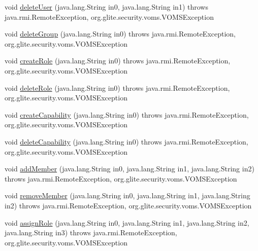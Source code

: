 \begin{DoxyCompactItemize}
\item 
void \hyperlink{classorg_1_1glite_1_1security_1_1voms_1_1service_1_1admin_1_1VOMSAdminSoapBindingStub_ad0af3872260de83449b50dcd1b0f8b10}{deleteUser} (java.lang.String in0, java.lang.String in1)  throws java.rmi.RemoteException, org.glite.security.voms.VOMSException 
\item 
void \hyperlink{classorg_1_1glite_1_1security_1_1voms_1_1service_1_1admin_1_1VOMSAdminSoapBindingStub_aa6eb70e83b2a1c72952a5f3726fcce1b}{deleteGroup} (java.lang.String in0)  throws java.rmi.RemoteException, org.glite.security.voms.VOMSException 
\item 
void \hyperlink{classorg_1_1glite_1_1security_1_1voms_1_1service_1_1admin_1_1VOMSAdminSoapBindingStub_af876f896cb28e9a5d1a64222fe304c3b}{createRole} (java.lang.String in0)  throws java.rmi.RemoteException, org.glite.security.voms.VOMSException 
\item 
void \hyperlink{classorg_1_1glite_1_1security_1_1voms_1_1service_1_1admin_1_1VOMSAdminSoapBindingStub_a03ec2c8b63f56bb7a458fe09887dcd7f}{deleteRole} (java.lang.String in0)  throws java.rmi.RemoteException, org.glite.security.voms.VOMSException 
\item 
void \hyperlink{classorg_1_1glite_1_1security_1_1voms_1_1service_1_1admin_1_1VOMSAdminSoapBindingStub_afd610c743bbb548c07de8fa956ec928e}{createCapability} (java.lang.String in0)  throws java.rmi.RemoteException, org.glite.security.voms.VOMSException 
\item 
void \hyperlink{classorg_1_1glite_1_1security_1_1voms_1_1service_1_1admin_1_1VOMSAdminSoapBindingStub_a0f1b143fbe9214e6c1ea58a6c8fd26a7}{deleteCapability} (java.lang.String in0)  throws java.rmi.RemoteException, org.glite.security.voms.VOMSException 
\item 
void \hyperlink{classorg_1_1glite_1_1security_1_1voms_1_1service_1_1admin_1_1VOMSAdminSoapBindingStub_a02949db1a71d56c534ff5594d764f324}{addMember} (java.lang.String in0, java.lang.String in1, java.lang.String in2)  throws java.rmi.RemoteException, org.glite.security.voms.VOMSException 
\item 
void \hyperlink{classorg_1_1glite_1_1security_1_1voms_1_1service_1_1admin_1_1VOMSAdminSoapBindingStub_ae4e57d7022d18c328f45b8828825a458}{removeMember} (java.lang.String in0, java.lang.String in1, java.lang.String in2)  throws java.rmi.RemoteException, org.glite.security.voms.VOMSException 
\item 
void \hyperlink{classorg_1_1glite_1_1security_1_1voms_1_1service_1_1admin_1_1VOMSAdminSoapBindingStub_a7a964ad89e832e3d04b1eac2bb4004f3}{assignRole} (java.lang.String in0, java.lang.String in1, java.lang.String in2, java.lang.String in3)  throws java.rmi.RemoteException, org.glite.security.voms.VOMSException 

\end{DoxyCompactItemize}
